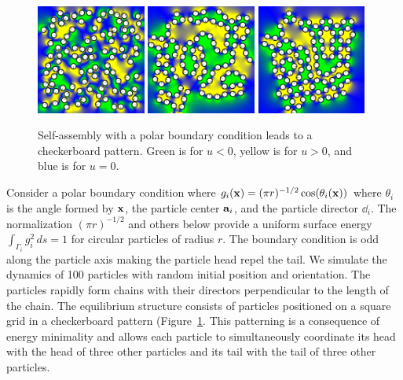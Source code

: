 \begin{figure}[h!]
  \begin{center}
    \includegraphics[width=0.32\textwidth]{figures/SpecificAim1/N100A1.pdf}
    \includegraphics[width=0.32\textwidth]{figures/SpecificAim1/N100A2.pdf}
    \includegraphics[width=0.32\textwidth]{figures/SpecificAim1/N100A3.pdf}
    \end{center}
  \caption{\label{fig:self-assemblyA} Self-assembly with a polar
  boundary condition leads to a checkerboard pattern. Green is for $u <
  0$, yellow is for $u > 0$, and blue is for $u = 0$.}
\end{figure}

Consider a polar boundary condition where $g_i(\xx) = (\pi r)^{-1/2}
\cos (\theta_i(\xx))$ where $\theta_i$ is the angle formed by $\xx$, the
particle center $\aa_i$, and the particle director $\dd_i$. The
normalization $(\pi r)^{-1/2}$ and others below provide a uniform
surface energy $\int_{\Gamma_i} g_i^2 \,ds = 1$ for circular particles
of radius $r$. The boundary condition is odd along the particle axis
making the particle head repel the tail.  We simulate the dynamics of
100 particles with random initial position and orientation. The
particles rapidly form chains with their directors perpendicular to the
length of the chain. The equilibrium structure consists of particles
positioned on a square grid in a checkerboard pattern
(Figure~\ref{fig:self-assemblyA}. This patterning is a consequence of
energy minimality and allows each particle to simultaneously coordinate
its head with the head of three other particles and its tail with the
tail of three other particles. 

